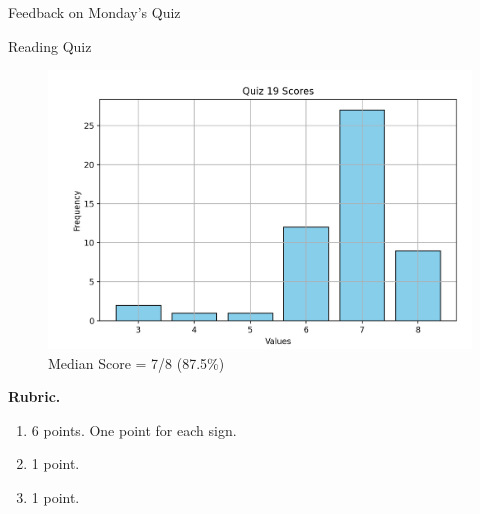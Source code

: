 \documentclass[10pt]{beamer}
\begin{document}
\begin{frame}[standout]
Feedback on Monday's Quiz
\end{frame}

\begin{frame}{Reading Quiz}
\footnotesize 
\begin{figure}[ht]
        \centering
        \includegraphics[width=.6\textwidth]{images/reading_quiz_scores}
   		 \caption{Median Score = 7/8 (87.5\%)}
\end{figure}
\vfill 
\textbf{Rubric.}  	
\begin{enumerate}
\item  6 points. One point for each sign.
\item 1 point.  
\item 1 point. 
\end{enumerate}
\end{frame}	
\end{document}
